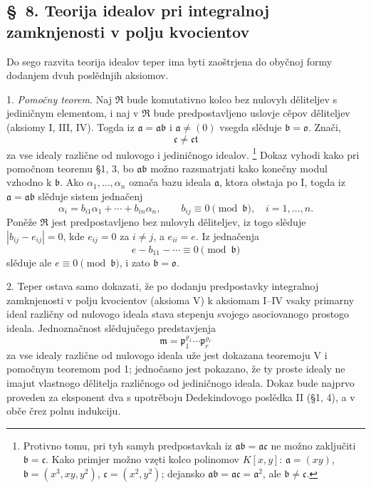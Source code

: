 \documentclass[11pt]{article}
\providecommand{\mR}{\mathfrak{R}}
\providecommand{\ma}{\mathfrak{a}}
\providecommand{\mb}{\mathfrak{b}}
\providecommand{\mc}{\mathfrak{c}}
\providecommand{\mm}{\mathfrak{m}}
\providecommand{\mo}{\mathfrak{o}}
\providecommand{\mt}{\mathfrak{t}}
\providecommand{\mpideal}{\mathfrak{p}}
\begin{document}
\setcounter{footnote}{29}

\subsection*{\S~8. Teorija idealov pri integralnoj zamknjenosti v polju kvocientov}

Do sego razvita teorija idealov teper ima byti zaoštrjena do obyčnoj formy dodanjem dvuh poslědnjih aksiomov.

1. \emph{Pomočny teorem.} Naj $\mR$ bude komutativno kolco bez nulovyh děliteljev s jediničnym elementom, i naj v $\mR$ bude predpostavljeno uslovje cěpov děliteljev (aksiomy I, III, IV). Togda iz $\ma=\ma\mb$ i $\ma\ne(0)$ vsegda slěduje $\mb=\mo$. Znači,
\[
        \mc\ne\mc\mt
\]
za vse idealy različne od nulovogo i jediničnogo idealov.
\footnote{Protivno tomu, pri tyh samyh predpostavkah iz $\ma\mb=\ma\mc$ ne možno zaključiti $\mb=\mc$. Kako primjer možno vzęti kolco polinomov $K[x,y]$: $\ma=(xy)$, $\mb=(x^3,xy,y^2)$, $\mc=(x^2,y^2)$; dejansko $\ma\mb=\ma\mc=\ma^2$, ale $\mb\ne\mc$.}
Dokaz vyhodi kako pri pomočnom teoremu §1, 3, bo $\ma\mb$ možno razsmatrjati kako konečny modul vzhodno k $\mb$. Ako $\alpha_1,\ldots,\alpha_n$ označa bazu ideala $\ma$, ktora obstaja po I, togda iz $\ma=\ma\mb$ slěduje sistem jednačenj
\[
        \alpha_i=b_{i1}\alpha_1+\cdots+b_{in}\alpha_n,
        \qquad b_{ij}\equiv0\pmod{\mb},\quad i=1,\ldots,n.
\]
Poněže $\mR$ jest predpostavljeno bez nulovyh děliteljev, iz togo slěduje $|b_{ij}-e_{ij}|=0$, kde $e_{ij}=0$ za $i\ne j$, a $e_{ii}=e$. Iz jednačenja
\[
        e-b_{11}-\cdots\equiv0\pmod{\mb}
\]
slěduje ale $e\equiv0\pmod{\mb}$, i zato $\mb=\mo$.

2. Teper ostava samo dokazati, že po dodanju predpostavky integralnoj zamknjenosti v polju kvocientov (aksioma V) k aksiomam I--IV vsaky primarny ideal različny od nulovogo ideala stava stepenju svojego asociovanogo prostogo ideala. Jednoznačnost slědujučego predstavjenja
\[
        \mm=\mpideal_1^{\varrho_1}\cdots\mpideal_r^{\varrho_r}
\]
za vse idealy različne od nulovogo ideala uže jest dokazana teoremoju V i pomočnym teoremom pod 1; jednočasno jest pokazano, že ty proste idealy ne imajut vlastnogo dělitelja različnogo od jediničnogo ideala. Dokaz bude najprvo proveden za eksponent dva s upotrěboju Dedekindovogo poslědka II (§1, 4), a v obče črez polnu indukciju.
\end{document}
